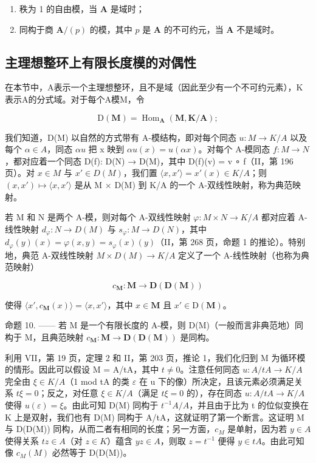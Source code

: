 \begin{enumerate}
\def\labelenumi{\alph{enumi})}
\item
  秩为 1 的自由模，当 \(\mathbf{A}\) 是域时；
\item
  同构于商 \(\mathbf{A} / (p)\) 的模，其中 \(p\) 是 \(\mathbf{A}\) 的不可约元，当 \(\mathbf{A}\) 不是域时。
\end{enumerate}

\subsection{主理想整环上有限长度模的对偶性}

在本节中，A表示一个主理想整环，且不是域（因此至少有一个不可约元素），K表示A的分式域。对于每个A模M，令

\[
\mathrm{D} (\mathbf {M}) = \operatorname{Hom} _ {\mathbf {A}} (\mathbf {M}, \mathbf {K} / \mathbf {A});
\]

我们知道，D(M) 以自然的方式带有 A-模结构，即对每个同态 \(u: M \to K/A\) 以及每个 \(\alpha \in A\)，同态 \(\alpha u\) 把 x 映到 \(\alpha u(x) = u(\alpha x)\)。对每个 A-模同态 \(f: M \to N\)，都对应着一个同态 D(f): D(N) → D(M)，其中 D(f)(v) = v ∘ f（II，第 196 页）。对 \(x \in M\) 与 \(x' \in D(M)\)，我们置 \(\langle x, x' \rangle = x'(x) \in K/A\)；则 \((x, x') \mapsto \langle x, x' \rangle\) 是从 M × D(M) 到 K/A 的一个 A-双线性映射，称为典范映射。

若 M 和 N 是两个 A-模，则对每个 A-双线性映射 \(\varphi: M \times N \to K/A\) 都对应着 A-线性映射 \(d_{\varphi}: N \to D(M)\) 与 \(s_{\varphi}: M \to D(N)\)，其中 \(d_{\varphi}(y)(x) = \varphi(x, y) = s_{\varphi}(x)(y)\)（II，第 268 页，命题 1 的推论）。特别地，典范 A-双线性映射 \(M \times D(M) \to K/A\) 定义了一个 A-线性映射（也称为典范映射）

\[
c _ {\mathbf {M}}: \mathbf {M} \rightarrow \mathbf {D} (\mathbf {D} (\mathbf {M}))
\]

使得 \(\langle x', c_{\mathbf{M}}(x) \rangle = \langle x, x' \rangle\)，其中 \(x \in \mathbf{M}\) 且 \(x' \in \mathrm{D}(\mathbf{M})\)。

命题 10. —— 若 M 是一个有限长度的 A-模，则 D(M)（一般而言非典范地）同构于 M，且典范映射 \(c_{\mathbf{M}}: \mathbf{M} \to \mathbf{D}(\mathbf{D}(\mathbf{M}))\) 是同构。

利用 VII，第 19 页，定理 2 和 II，第 203 页，推论 1，我们化归到 M 为循环模的情形。因此可以假设 M = A/tA，其中 \(t \neq 0\)。注意任何同态 \(u: A/tA \to K/A\) 完全由 \(\xi \in K/A\)（1 mod tA 的类 \(\varepsilon\) 在 u 下的像）所决定，且该元素必须满足关系 \(t\xi = 0\)；反之，对任意 \(\xi \in K/A\)（满足 \(t\xi = 0\) 的），存在同态 \(u: A/tA \to K/A\) 使得 \(u(\varepsilon) = \xi\)。由此可知 D(M) 同构于 \(t^{-1}A/A\)，并且由于比为 t 的位似变换在 K 上是双射，我们也有 D(M) 同构于 A/tA，这就证明了第一个断言。这证明 M 与 D(D(M)) 同构，从而二者有相同的长度；另一方面，\(c_{M}\) 是单射，因为若 \(y \in A\) 使得关系 \(tz \in A\)（对 \(z \in K\)）蕴含 \(yz \in A\)，则取 \(z = t^{-1}\) 便得 \(y \in tA\)。由此可知像 \(c_{M}(M)\) 必然等于 D(D(M))。

